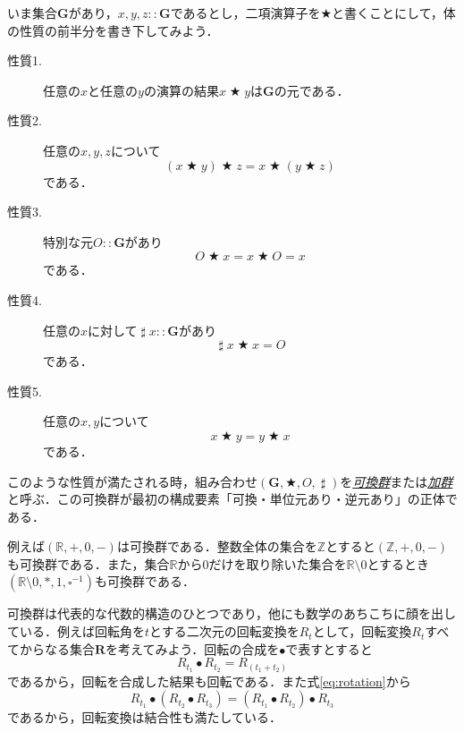 \documentclass[a4paper]{jsbook}
\newcommand{\keyword}[1]{{\underline{\emph{#1}}}}
\newcommand{\mathSet}[1]{\mathbf{#1}} %
\newcommand{\mathSpecialSet}[1]{\mathbb{#1}} %
\newcommand{\mathSomething}{\square}  %
\DeclareMathOperator{\mathInverse}{\sharp}  %
\newcommand{\mathAnyBinaryOperator}{\mathbin{\bigstar}}
\newcommand{\mathIn}{\mathrel{::}}
\newcommand{\mathGroup}[4]{(#1,#2,#3,#4)}
\begin{document}
いま集合$\mathSet{G}$があり，$x,y,z\mathIn\mathSet{G}$であるとし，二項演算子を$\mathAnyBinaryOperator$と書くことにして，体の性質の前半分を書き下してみよう．
\begin{description}
\item[性質1.] 任意の$x$と任意の$y$の演算の結果$x\mathAnyBinaryOperator y$は$\mathSet{G}$の元である．
\item[性質2.] 任意の$x,y,z$について
\begin{equation}
(x\mathAnyBinaryOperator y)\mathAnyBinaryOperator z=x\mathAnyBinaryOperator(y\mathAnyBinaryOperator z)
\end{equation}
である．
\item[性質3.] 特別な元$O\mathIn\mathSet{G}$があり
\begin{equation}
O\mathAnyBinaryOperator x=x\mathAnyBinaryOperator O=x
\end{equation}
である．
\item[性質4.] 任意の$x$に対して$\mathInverse x\mathIn\mathSet{G}$があり
\begin{equation}
\mathInverse x\mathAnyBinaryOperator x=O
\end{equation}
である．
\item[性質5.] 任意の$x,y$について
\begin{equation}
x\mathAnyBinaryOperator y=y\mathAnyBinaryOperator x
\end{equation}
である．
\end{description}
このような性質が満たされる時，組み合わせ$\mathGroup{\mathSet{G}}{\mathAnyBinaryOperator}{O}{\mathInverse}$を\keyword{可換群}または\keyword{加群}と呼ぶ．この可換群が最初の構成要素「可換・単位元あり・逆元あり」の正体である．

例えば$\mathGroup{\mathSpecialSet{R}}{+}{0}{-}$は可換群である．整数全体の集合を$\mathSpecialSet{Z}$とすると$\mathGroup{\mathSpecialSet{Z}}{+}{0}{-}$も可換群である．また，集合$\mathSpecialSet{R}$から$0$だけを取り除いた集合を$\mathSpecialSet{R}\setminus0$とするとき$\mathGroup{\mathSpecialSet{R}\setminus0}{*}{1}{\mathSomething^{-1}}$も可換群である．

可換群は代表的な代数的構造のひとつであり，他にも数学のあちこちに顔を出している．例えば回転角を$t$とする二次元の回転変換を$R_t$として，回転変換$R_t$すべてからなる集合$\mathSet{R}$を考えてみよう．回転の合成を$\bullet$で表すとすると
\begin{equation}
\label{eq:rotation}
R_{t_1}\bullet R_{t_2}=R_{(t_1+t_2)}
\end{equation}
であるから，回転を合成した結果も回転である．また式\eqref{eq:rotation}から
\begin{equation}
R_{t_1}\bullet\left(R_{t_2}\bullet R_{t_3}\right)=\left(R_{t_1}\bullet R_{t_2}\right)\bullet R_{t_3}
\end{equation}
であるから，回転変換は結合性も満たしている．
\end{document}

